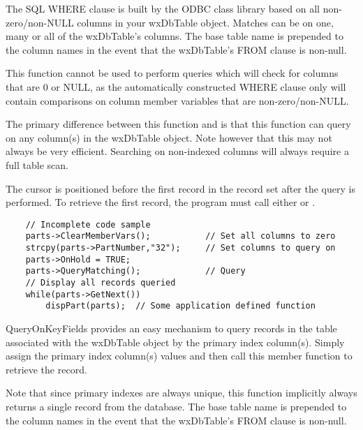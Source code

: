 
The SQL WHERE clause is built by the ODBC class library based on all 
non-zero/non-NULL columns in your wxDbTable object.  Matches can be on one, 
many or all of the wxDbTable's columns.  The base table name is prepended 
to the column names in the event that the wxDbTable's FROM clause is non-null.

This function cannot be used to perform queries which will check for 
columns that are 0 or NULL, as the automatically constructed WHERE clause 
only will contain comparisons on column member variables that are 
non-zero/non-NULL.

The primary difference between this function and  
is that this function can query on any column(s) in the wxDbTable object.  
Note however that this may not always be very efficient.  Searching on 
non-indexed columns will always require a full table scan.

The cursor is positioned before the first record in the record set after 
the query is performed.  To retrieve the first record, the program must call 
either  or 
.


\begin{verbatim}
    // Incomplete code sample
    parts->ClearMemberVars();           // Set all columns to zero
    strcpy(parts->PartNumber,"32");     // Set columns to query on
    parts->OnHold = TRUE;
    parts->QueryMatching();             // Query
    // Display all records queried
    while(parts->GetNext())
        dispPart(parts);  // Some application defined function
\end{verbatim}


\label{wxdbtablequeryonkeyfields}


QueryOnKeyFields provides an easy mechanism to query records in the table 
associated with the wxDbTable object by the primary index column(s).  Simply 
assign the primary index column(s) values and then call this member function 
to retrieve the record.  

Note that since primary indexes are always unique, this function implicitly 
always returns a single record from the database. The base table name is 
prepended to the column names in the event that the wxDbTable's FROM clause 
is non-null.

